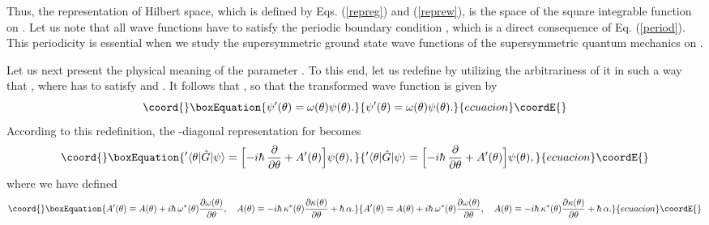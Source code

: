\documentclass[a4paper,12pt]{article}
\begin{document}
Thus, the representation of Hilbert space, which is defined by
Eqs. (\ref{repreg}) and (\ref{reprew}), is the space of the square integrable 
function on \coordHE{}. Let us note that all wave functions 
have to satisfy the periodic boundary condition \coordHE{}, which is a direct consequence of Eq. (\ref{period}). 
This periodicity is essential when we study the supersymmetric ground state
wave functions of the supersymmetric quantum mechanics on \coordHE{}.
\par
Let us next present the physical meaning of the parameter \myHighlight{$\alpha$}\coordHE{}. 
To this end, let us redefine \myHighlight{$\kappa(\theta)$}\coordHE{} 
by utilizing the arbitrariness of it in 
such a way that \myHighlight{$\kappa(\theta)=\omega(\theta)\kappa^{\prime}(\theta)$}\coordHE{}, where 
\myHighlight{$\omega(\theta)$}\coordHE{} has to satisfy \coordHE{} 
and \myHighlight{$\omega(\theta+2\pi)=\omega(\theta)$}\coordHE{}. It follows that    
\myHighlight{$\ket{\theta}=\omega(\theta)\ket{\theta}^{\prime}$}\coordHE{}, so that the transformed
wave function \myHighlight{$\psi^{\prime}(\theta)$}\coordHE{} is given by
\begin{equation}\coord{}\boxEquation{
\psi^{\prime}(\theta)=\omega(\theta)\psi(\theta).
\label{gtrf1}
}{
\psi^{\prime}(\theta)=\omega(\theta)\psi(\theta).
}{ecuacion}\coordE{}\end{equation} 
According to this redefinition, the \myHighlight{$\hw$}\coordHE{}-diagonal representation for \myHighlight{$\hg$}\coordHE{}
becomes
\begin{equation}\coord{}\boxEquation{ 
'\bra{\theta}{\hg}\ket{\psi}=
\Bigl[-i\hbar~{\del\over{\del\theta}}+A^{\prime}(\theta)\Bigr]
\psi(\theta),
\label{newrepreg}
}{ 
'\bra{\theta}{\hg}\ket{\psi}=
\Bigl[-i\hbar~{\del\over{\del\theta}}+A^{\prime}(\theta)\Bigr]
\psi(\theta),
}{ecuacion}\coordE{}\end{equation} 
where we have defined 
\begin{equation}\coord{}\boxEquation{
A^{\prime}(\theta) \equiv A(\theta)+i\hbar~\omega^*(\theta)
{{\del\omega(\theta)}\over{\del\theta}}, \quad
A(\theta)\equiv -i\hbar~\kappa^*({\theta})
{{\del\kappa(\theta)}\over{\del\theta}}+\hbar~\alpha.
\label{gtrf2}
}{
A^{\prime}(\theta) \equiv A(\theta)+i\hbar~\omega^*(\theta)
{{\del\omega(\theta)}\over{\del\theta}}, \quad
A(\theta)\equiv -i\hbar~\kappa^*({\theta})
{{\del\kappa(\theta)}\over{\del\theta}}+\hbar~\alpha.
}{ecuacion}\coordE{}\end{equation}
\end{document}
